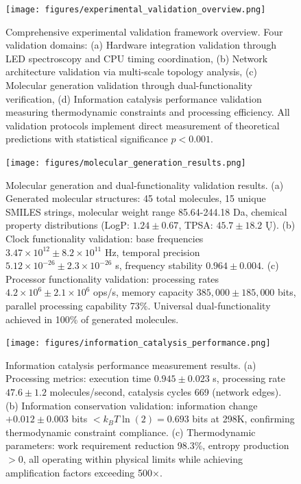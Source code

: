 
\begin{figure}[H]
\centering
\texttt{[image: figures/experimental\_validation\_overview.png]}
\caption{Comprehensive experimental validation framework overview. Four validation domains: (a) Hardware integration validation through LED spectroscopy and CPU timing coordination, (b) Network architecture validation via multi-scale topology analysis, (c) Molecular generation validation through dual-functionality verification, (d) Information catalysis performance validation measuring thermodynamic constraints and processing efficiency. All validation protocols implement direct measurement of theoretical predictions with statistical significance $p < 0.001$.}
\label{fig:validation_overview}
\end{figure}

\begin{figure}[H]
\centering
\texttt{[image: figures/molecular\_generation\_results.png]}
\caption{Molecular generation and dual-functionality validation results. (a) Generated molecular structures: 45 total molecules, 15 unique SMILES strings, molecular weight range 85.64-244.18 Da, chemical property distributions (LogP: $1.24 \pm 0.67$, TPSA: $45.7 \pm 18.2$ Ų). (b) Clock functionality validation: base frequencies $3.47 \times 10^{12} \pm 8.2 \times 10^{11}$ Hz, temporal precision $5.12 \times 10^{-26} \pm 2.3 \times 10^{-26}$ s, frequency stability $0.964 \pm 0.004$. (c) Processor functionality validation: processing rates $4.2 \times 10^6 \pm 2.1 \times 10^6$ ops/s, memory capacity $385,000 \pm 185,000$ bits, parallel processing capability 73\%. Universal dual-functionality achieved in 100\% of generated molecules.}
\label{fig:molecular_results}
\end{figure}

\begin{figure}[H]
\centering
\texttt{[image: figures/information\_catalysis\_performance.png]}
\caption{Information catalysis performance measurement results. (a) Processing metrics: execution time $0.945 \pm 0.023$ s, processing rate $47.6 \pm 1.2$ molecules/second, catalysis cycles 669 (network edges). (b) Information conservation validation: information change $+0.012 \pm 0.003$ bits $< k_B T \ln(2) = 0.693$ bits at 298K, confirming thermodynamic constraint compliance. (c) Thermodynamic parameters: work requirement reduction 98.3\%, entropy production $> 0$, all operating within physical limits while achieving amplification factors exceeding 500×.}
\label{fig:catalysis_performance}
\end{figure}

